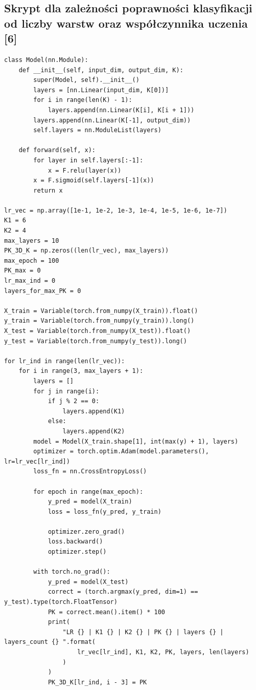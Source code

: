 \documentclass{article}
\begin{document}
\subsection{Skrypt dla zależności poprawności klasyfikacji od liczby warstw oraz współczynnika uczenia [6]}
\begin{verbatim}
class Model(nn.Module):
    def __init__(self, input_dim, output_dim, K):
        super(Model, self).__init__()
        layers = [nn.Linear(input_dim, K[0])]
        for i in range(len(K) - 1):
            layers.append(nn.Linear(K[i], K[i + 1]))
        layers.append(nn.Linear(K[-1], output_dim))
        self.layers = nn.ModuleList(layers)

    def forward(self, x):
        for layer in self.layers[:-1]:
            x = F.relu(layer(x))
        x = F.sigmoid(self.layers[-1](x))
        return x

lr_vec = np.array([1e-1, 1e-2, 1e-3, 1e-4, 1e-5, 1e-6, 1e-7])
K1 = 6
K2 = 4
max_layers = 10
PK_3D_K = np.zeros((len(lr_vec), max_layers))
max_epoch = 100
PK_max = 0
lr_max_ind = 0
layers_for_max_PK = 0

X_train = Variable(torch.from_numpy(X_train)).float()
y_train = Variable(torch.from_numpy(y_train)).long()
X_test = Variable(torch.from_numpy(X_test)).float()
y_test = Variable(torch.from_numpy(y_test)).long()

for lr_ind in range(len(lr_vec)):
    for i in range(3, max_layers + 1):
        layers = []
        for j in range(i):
            if j % 2 == 0:
                layers.append(K1)
            else:
                layers.append(K2)
        model = Model(X_train.shape[1], int(max(y) + 1), layers)
        optimizer = torch.optim.Adam(model.parameters(), lr=lr_vec[lr_ind])
        loss_fn = nn.CrossEntropyLoss()

        for epoch in range(max_epoch):
            y_pred = model(X_train)
            loss = loss_fn(y_pred, y_train)

            optimizer.zero_grad()
            loss.backward()
            optimizer.step()

        with torch.no_grad():
            y_pred = model(X_test)
            correct = (torch.argmax(y_pred, dim=1) == y_test).type(torch.FloatTensor)
            PK = correct.mean().item() * 100
            print(
                "LR {} | K1 {} | K2 {} | PK {} | layers {} | layers_count {} ".format(
                    lr_vec[lr_ind], K1, K2, PK, layers, len(layers)
                )
            )
            PK_3D_K[lr_ind, i - 3] = PK


\end{verbatim}
\end{document}
